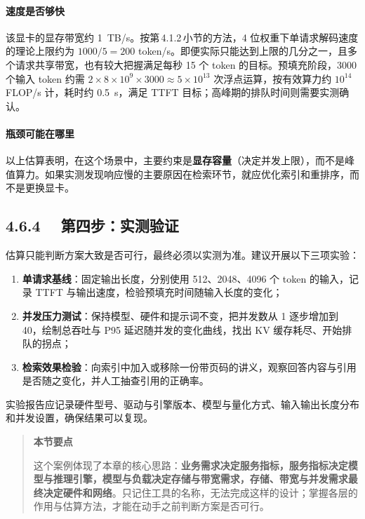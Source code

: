 \documentclass{article}
\begin{document}
\paragraph{速度是否够快} 该显卡的显存带宽约 \SI{1}{TB/s}。按第\,4.1.2\,小节的方法，4 位权重下单请求解码速度的理论上限约为 $1000/5=200$ token/s。即便实际只能达到上限的几分之一，且多个请求共享带宽，也有较大把握满足每秒 15 个 token 的目标。预填充阶段，3000 个输入 token 约需 $2\times8\times10^{9}\times3000\approx5\times10^{13}$ 次浮点运算，按有效算力约 $10^{14}$\,FLOP/s 计，耗时约 \SI{0.5}{s}，满足 TTFT 目标；高峰期的排队时间则需要实测确认。

\paragraph{瓶颈可能在哪里} 以上估算表明，在这个场景中，主要约束是\textbf{显存容量}（决定并发上限），而不是峰值算力。如果实测发现响应慢的主要原因在检索环节，就应优化索引和重排序，而不是更换显卡。

\subsection*{4.6.4　 第四步：实测验证}

估算只能判断方案大致是否可行，最终必须以实测为准。建议开展以下三项实验：
\begin{enumerate}
  \item \textbf{单请求基线}：固定输出长度，分别使用 512、2048、4096 个 token 的输入，记录 TTFT 与输出速度，检验预填充时间随输入长度的变化；
  \item \textbf{并发压力测试}：保持模型、硬件和提示词不变，把并发数从 1 逐步增加到 40，绘制总吞吐与 P95 延迟随并发的变化曲线，找出 KV 缓存耗尽、开始排队的拐点；
  \item \textbf{检索效果检验}：向索引中加入或移除一份带页码的讲义，观察回答内容与引用是否随之变化，并人工抽查引用的正确率。
\end{enumerate}
实验报告应记录硬件型号、驱动与引擎版本、模型与量化方式、输入输出长度分布和并发设置，确保结果可以复现。

\begin{quote}
\textbf{本节要点}


这个案例体现了本章的核心思路：\textbf{业务需求决定服务指标，服务指标决定模型与推理引擎，模型与负载决定存储与带宽需求，存储、带宽与并发需求最终决定硬件和网络}。只记住工具的名称，无法完成这样的设计；掌握各层的作用与估算方法，才能在动手之前判断方案是否可行。
\end{quote}
\end{document}
